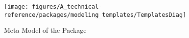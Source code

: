 %
%

\begin{figure}[htb]
  \centering
  \texttt{[image: figures/A\_technical-reference/packages/modeling\_templates/TemplatesDiag]}
  \caption{Meta-Model of the  Package}
  \label{fig:MM:templates}
\end{figure}
